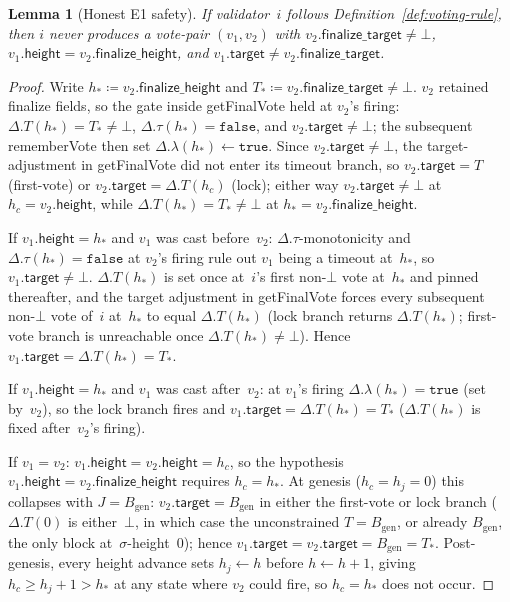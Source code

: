 \ifx\litemode\undefined\documentclass{article}\fi
\newcommand{\genesis}{\ensuremath{B_{\mathrm{gen}}}}
\newcommand{\target}{\mathsf{target}}
\newcommand{\height}{\mathsf{height}}
\newcommand{\finalizeHeight}{\mathsf{finalize\_height}}
\newcommand{\finalizeTarget}{\mathsf{finalize\_target}}
\newcommand{\getFinalVote}{\textsf{getFinalVote}\xspace}
\newcommand{\rememberVote}{\textsf{rememberVote}\xspace}
\theoremstyle{plain}
\newtheorem{lemma}{Lemma}
\theoremstyle{definition}
\theoremstyle{remark}
\begin{document}
\begin{lemma}[Honest E1 safety]\label{lem:honest-e1-safety}
If validator~$i$ follows Definition~\ref{def:voting-rule}, then $i$ never produces a vote-pair $(v_1, v_2)$ with $v_2.\finalizeTarget \neq \bot$, $v_1.\height = v_2.\finalizeHeight$, and $v_1.\target \neq v_2.\finalizeTarget$.
\end{lemma}

\begin{proof}
Write $h_\ast \coloneqq v_2.\finalizeHeight$ and $T_\ast \coloneqq v_2.\finalizeTarget \neq \bot$.
$v_2$ retained finalize fields, so the gate inside \getFinalVote held at $v_2$'s firing: $\Delta.T(h_\ast) = T_\ast \neq \bot$, $\Delta.\tau(h_\ast) = \mathtt{false}$, and $v_2.\target \neq \bot$; the subsequent \rememberVote then set $\Delta.\lambda(h_\ast) \gets \mathtt{true}$.
Since $v_2.\target \neq \bot$, the target-adjustment in \getFinalVote did not enter its timeout branch, so $v_2.\target = T$ (first-vote) or $v_2.\target = \Delta.T(h_c)$ (lock); either way $v_2.\target \neq \bot$ at $h_c = v_2.\height$, while $\Delta.T(h_\ast) = T_\ast \neq \bot$ at $h_\ast = v_2.\finalizeHeight$.

If $v_1.\height = h_\ast$ and $v_1$ was cast before~$v_2$: $\Delta.\tau$-monotonicity and $\Delta.\tau(h_\ast) = \mathtt{false}$ at $v_2$'s firing rule out $v_1$ being a timeout at~$h_\ast$, so $v_1.\target \neq \bot$.
$\Delta.T(h_\ast)$ is set once at~$i$'s first non-$\bot$ vote at~$h_\ast$ and pinned thereafter, and the target adjustment in \getFinalVote forces every subsequent non-$\bot$ vote of~$i$ at~$h_\ast$ to equal $\Delta.T(h_\ast)$ (lock branch returns $\Delta.T(h_\ast)$; first-vote branch is unreachable once $\Delta.T(h_\ast) \neq \bot$).
Hence $v_1.\target = \Delta.T(h_\ast) = T_\ast$.

If $v_1.\height = h_\ast$ and $v_1$ was cast after~$v_2$: at $v_1$'s firing $\Delta.\lambda(h_\ast) = \mathtt{true}$ (set by~$v_2$), so the lock branch fires and $v_1.\target = \Delta.T(h_\ast) = T_\ast$ ($\Delta.T(h_\ast)$ is fixed after~$v_2$'s firing).

If $v_1 = v_2$: $v_1.\height = v_2.\height = h_c$, so the hypothesis $v_1.\height = v_2.\finalizeHeight$ requires $h_c = h_\ast$.
At genesis ($h_c = h_j = 0$) this collapses with $J = \genesis$: $v_2.\target = \genesis$ in either the first-vote or lock branch ($\Delta.T(0)$ is either~$\bot$, in which case the unconstrained $T = \genesis$, or already $\genesis$, the only block at~$\sigma$-height~$0$); hence $v_1.\target = v_2.\target = \genesis = T_\ast$.
Post-genesis, every height advance sets $h_j \gets h$ before $h \gets h+1$, giving $h_c \geq h_j + 1 > h_\ast$ at any state where $v_2$ could fire, so $h_c = h_\ast$ does not occur.
\end{proof}
\end{document}
